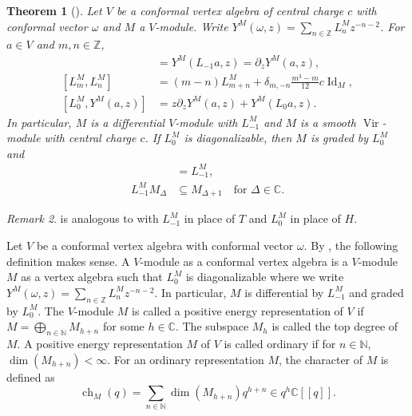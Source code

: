 \documentclass[a4paper, 12pt, reqno]{amsart}
\newtheorem{theorem}{Theorem}[subsection]
\theoremstyle{remark}
\newtheorem{remark}[theorem]{Remark}
\numberwithin{equation}{subsection}
\DeclareMathOperator{\Vir}{Vir}
\DeclareMathOperator{\Id}{Id}
\DeclareMathOperator{\ch}{ch}
\begin{document}
\begin{theorem}[{\cite[Proposition 4.1.5 and (4.1.18)]{lepowsky_introduction_2004}}]
  \label{thr:22}
  Let $V$ be a conformal vertex algebra of central charge $c$ with conformal vector $\omega$ and $M$ a $V$-module.
  Write $Y^M(\omega, z) = \sum_{n \in \mathbb{Z}}L^M_nz^{-n - 2}$.
  For $a \in V$ and $m, n \in \mathbb{Z}$,
  \begin{align*}
    [L^M_{-1}, Y^M(a, z)] &= Y^M(L_{-1}a, z) = \partial_zY^M(a, z), \\
    [L^M_m, L^M_n] &=(m - n)L^M_{m + n} + \delta_{m, -n}\frac{m^3 - m}{12}c\Id_M, \\
    [L^M_0, Y^M(a, z)] &= z\partial_zY^M(a, z) + Y^M(L_0a, z).
  \end{align*}
  In particular, $M$ is a differential $V$-module with $L_{-1}^M $ and $M$ is a smooth $\Vir$-module with central charge $c$.
  If $L^M_0$ is diagonalizable, then $M$ is graded by $L_0^M$ and
  \begin{align*}
    [L_0^M,L_{-1}^M]&=L_{-1}^M, \\
    L^M_{-1}M_\Delta&\subseteq M_{\Delta+1} \quad \text{for }\Delta \in \mathbb{C}.
  \end{align*}
\end{theorem}

\begin{remark}
  \label{rmk:21}
   is analogous to  with $L_{-1}^M$ in place of $T$ and $L_0^M$ in place of $H$.
\end{remark}

Let $V$ be a conformal vertex algebra with conformal vector $\omega$.
By , the following definition makes sense.
A $V$-module as a conformal vertex algebra is a $V$-module $M$ as a vertex algebra such that $L^M_0$ is diagonalizable where we write $Y^M(\omega, z) = \sum_{n \in \mathbb{Z}}L^M_nz^{-n - 2}$.
In particular, $M$ is differential by $L^M_{-1}$ and graded by $L^M_0$.
The $V$-module $M$ is called a positive energy representation of $V$ if $M = \bigoplus_{n \in \mathbb{N}}M_{h + n}$ for some $h \in \mathbb{C}$.
The subspace $M_h$ is called the top degree of $M$.
A positive energy representation $M$ of $V$ is called ordinary if for $n \in \mathbb{N}$, $\dim(M_{h + n}) < \infty$.
For an ordinary representation $M$, the character of $M$ is defined as
\begin{equation*}
  \ch_M(q) = \sum_{n \in \mathbb{N}}\dim(M_{h + n})q^{h + n} \in q^h\mathbb{C}[[q]].
\end{equation*}
\end{document}
